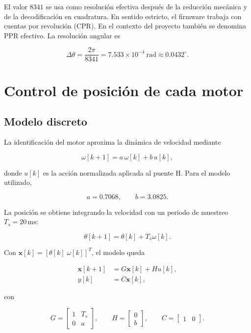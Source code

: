 \documentclass[11pt,a4paper]{article}
\newcommand{\vect}[1]{\bm{#1}}
\begin{document}
El valor $8341$ se usa como resolución efectiva después de la reducción mecánica y de la decodificación en cuadratura. En sentido estricto, el firmware trabaja con cuentas por revolución (CPR). En el contexto del proyecto también se denomina PPR efectivo. La resolución angular es

\begin{equation}
\Delta\theta=\frac{2\pi}{8341}
=7.533\times10^{-4}\ \mathrm{rad}
\approx 0.0432^{\circ}.
\end{equation}

\section{Control de posición de cada motor}

\subsection{Modelo discreto}

La identificación del motor aproxima la dinámica de velocidad mediante

\begin{equation}
\omega[k+1]=a\,\omega[k]+b\,u[k],
\end{equation}

donde $u[k]$ es la acción normalizada aplicada al puente H. Para el modelo utilizado,

\begin{equation}
a=0.7068, \qquad b=3.0825.
\end{equation}

La posición se obtiene integrando la velocidad con un periodo de muestreo $T_s=20\,\mathrm{ms}$:

\begin{equation}
\theta[k+1]=\theta[k]+T_s\omega[k].
\end{equation}

Con $\vect{x}[k]=[\theta[k]\;\omega[k]]^T$, el modelo queda

\begin{align}
\vect{x}[k+1]&=G\vect{x}[k]+H u[k],\\
y[k]&=C\vect{x}[k],
\end{align}

con

\begin{equation}
G=
\begin{bmatrix}
1&T_s\\
0&a
\end{bmatrix},\qquad
H=
\begin{bmatrix}
0\\b
\end{bmatrix},\qquad
C=\begin{bmatrix}1&0\end{bmatrix}.
\end{equation}
\end{document}
